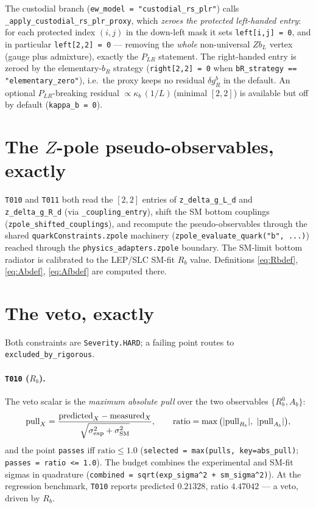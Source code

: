 \documentclass[11pt]{article}
\newcommand{\PLR}{P_{LR}}
\newcommand{\code}[1]{\texttt{#1}}
\newcommand{\dgR}{\delta g_R^b}
\theoremstyle{definition}
\begin{document}
The custodial branch (\code{ew\_model = "custodial\_rs\_plr"}) calls
\code{\_apply\_custodial\_rs\_plr\_proxy}, which \emph{zeroes the protected
left-handed entry}: for each protected index $(i,j)$ in the down-left mask it
sets \code{left[i,j] = 0}, and in particular \code{left[2,2] = 0} --- removing
the \emph{whole} non-universal $Zb_L$ vertex (gauge plus admixture), exactly the
$\PLR$ statement. The right-handed entry is zeroed by the elementary-$b_R$
strategy (\code{right[2,2] = 0} when \code{bR\_strategy == "elementary\_zero"}),
i.e.\ the proxy keeps no residual $\dgR$ in the default. An optional
$\PLR$-breaking residual $\propto \kappa_b\,(1/L)\,$(minimal $[2,2]$) is available
but off by default (\code{kappa\_b = 0}).

\section{The $Z$-pole pseudo-observables, exactly}
\label{sec:zpolecode}

\code{T010} and \code{T011} both read the $[2,2]$ entries of
\code{z\_delta\_g\_L\_d} and \code{z\_delta\_g\_R\_d} (via \code{\_coupling\_entry}),
shift the SM bottom couplings (\code{zpole\_shifted\_couplings}), and recompute
the pseudo-observables through the shared \code{quarkConstraints.zpole} machinery
(\code{zpole\_evaluate\_quark("b", ...)}) reached through the
\code{physics\_adapters.zpole} boundary. The SM-limit bottom radiator is
calibrated to the LEP/SLC SM-fit $R_b$ value. Definitions \eqref{eq:Rbdef},
\eqref{eq:Abdef}, \eqref{eq:Afbdef} are computed there.

\section{The veto, exactly}
\label{sec:codeveto}

Both constraints are \code{Severity.HARD}; a failing point routes to
\code{excluded\_by\_rigorous}.

\paragraph{\code{T010} ($R_b$).} The veto scalar is the \emph{maximum absolute
pull} over the two observables $\{R_b^0, A_b\}$:
\begin{equation}
\text{pull}_X = \frac{\text{predicted}_X - \text{measured}_X}{\sqrt{\sigma_{\rm exp}^2 + \sigma_{\rm SM}^2}},
\qquad
\text{ratio} = \max\big(|\text{pull}_{R_b}|,\ |\text{pull}_{A_b}|\big),
\end{equation}
and the point \code{passes} iff $\text{ratio}\le 1.0$ (\code{selected =
max(pulls, key=abs\_pull)}; \code{passes = ratio <= 1.0}). The budget combines
the experimental and SM-fit sigmas in quadrature
(\code{combined = sqrt(exp\_sigma\^{}2 + sm\_sigma\^{}2)}). At the regression
benchmark, \code{T010} reports predicted $0.21328$, ratio $4.47042$ --- a veto,
driven by $R_b$.
\end{document}
